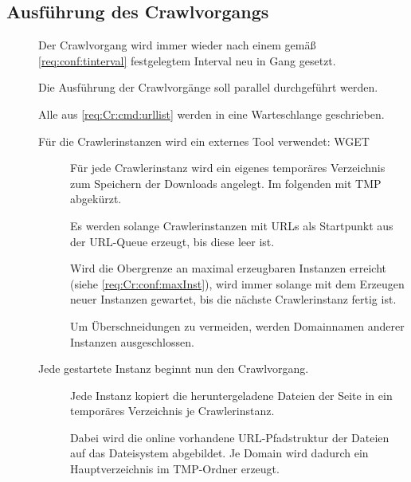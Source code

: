\subsection{Ausführung des Crawlvorgangs} \label{spec:crawler:exec}
\begin{description}
	\item []
		Der Crawlvorgang wird immer wieder nach einem gemäß \ref{req:conf:tinterval} festgelegtem
		Interval neu in Gang gesetzt. 
	\item []
		Die Ausführung der Crawlvorgänge soll parallel durchgeführt werden.
	\item []
		Alle aus \ref{req:Cr:cmd:urllist} werden in eine Warteschlange geschrieben.
	\item []
				Für die Crawlerinstanzen wird ein externes Tool verwendet: WGET
		\begin{description}
			\item []
				Für jede Crawlerinstanz wird ein eigenes temporäres Verzeichnis zum Speichern
				der Downloads angelegt. Im folgenden mit TMP abgekürzt.
			\item []
				Es werden solange Crawlerinstanzen mit URLs als Startpunkt aus der URL-Queue erzeugt,
				bis diese leer ist. 
			\item []
				Wird die Obergrenze an maximal erzeugbaren Instanzen erreicht 
				(siehe \ref{req:Cr:conf:maxInst}),
				wird immer solange mit dem Erzeugen neuer Instanzen gewartet,
				bis die nächste	Crawlerinstanz fertig ist.
			\item []
				Um Überschneidungen zu vermeiden, werden Domainnamen anderer Instanzen ausgeschlossen.
		\end{description}
	\item []
		Jede gestartete Instanz beginnt nun den Crawlvorgang.
		\begin{description}
			\item []
				Jede Instanz kopiert die heruntergeladene Dateien 
				der Seite in ein temporäres Verzeichnis je Crawlerinstanz.
			\item []
				Dabei wird die online vorhandene URL-Pfadstruktur der Dateien 
				auf das Dateisystem abgebildet.
				Je Domain wird dadurch ein Hauptverzeichnis im TMP-Ordner erzeugt.

\end{description}
\end{description}
